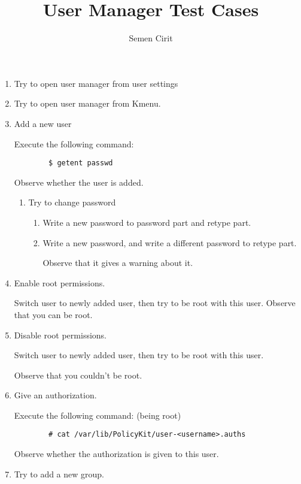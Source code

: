 \documentclass[a4paper,10pt]{article}
\title{User Manager Test Cases}
\author{Semen Cirit}
\begin{document}
\maketitle
\begin{enumerate}

\item Try to open user manager from user settings

\item Try to open user manager from Kmenu.

\item Add a new user

    Execute the following command:
    \begin{verbatim}
        $ getent passwd 
    \end{verbatim}
    Observe whether the user is added.

    \begin{enumerate}
    \item Try to change password
        \begin{enumerate}
        \item Write a new password to password part and retype part.
        \item Write a new password, and write a different password to retype part.

                Observe that it gives a warning about it.
        \end{enumerate}
    \end{enumerate}

    \item Enable root permissions.

          Switch user to newly added user, then try to be root with this user.
        Observe that you can be root.
    \item Disable root permissions.

        Switch user to newly added user, then try to be root with this user.
    
        Observe that you couldn't be root.

    \item Give an authorization.

        Execute the following command: (being root)
    \begin{verbatim}
        # cat /var/lib/PolicyKit/user-<username>.auths
    \end{verbatim}
        Observe whether the authorization is given to this user.

    
\item Try to add a new group.


\end{enumerate}
\end{document}
